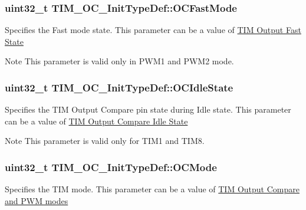 \subsubsection[{\texorpdfstring{O\+C\+Fast\+Mode}{OCFastMode}}]{\setlength{\rightskip}{0pt plus 5cm}uint32\+\_\+t T\+I\+M\+\_\+\+O\+C\+\_\+\+Init\+Type\+Def\+::\+O\+C\+Fast\+Mode}\hypertarget{struct_t_i_m___o_c___init_type_def_a4c4203c5ed779ac86fb793bb9d628e55}{}\label{struct_t_i_m___o_c___init_type_def_a4c4203c5ed779ac86fb793bb9d628e55}
Specifies the Fast mode state. This parameter can be a value of \hyperlink{group___t_i_m___output___fast___state}{T\+IM Output Fast State} \begin{DoxyNote}{Note}
This parameter is valid only in P\+W\+M1 and P\+W\+M2 mode. 
\end{DoxyNote}
\subsubsection[{\texorpdfstring{O\+C\+Idle\+State}{OCIdleState}}]{\setlength{\rightskip}{0pt plus 5cm}uint32\+\_\+t T\+I\+M\+\_\+\+O\+C\+\_\+\+Init\+Type\+Def\+::\+O\+C\+Idle\+State}\hypertarget{struct_t_i_m___o_c___init_type_def_ace3e2b76ca2fca0f4961585ed9ebecf5}{}\label{struct_t_i_m___o_c___init_type_def_ace3e2b76ca2fca0f4961585ed9ebecf5}
Specifies the T\+IM Output Compare pin state during Idle state. This parameter can be a value of \hyperlink{group___t_i_m___output___compare___idle___state}{T\+IM Output Compare Idle State} \begin{DoxyNote}{Note}
This parameter is valid only for T\+I\+M1 and T\+I\+M8. 
\end{DoxyNote}
\subsubsection[{\texorpdfstring{O\+C\+Mode}{OCMode}}]{\setlength{\rightskip}{0pt plus 5cm}uint32\+\_\+t T\+I\+M\+\_\+\+O\+C\+\_\+\+Init\+Type\+Def\+::\+O\+C\+Mode}\hypertarget{struct_t_i_m___o_c___init_type_def_ae5faa1cba0b3f1ab6179cc54e1015ee8}{}\label{struct_t_i_m___o_c___init_type_def_ae5faa1cba0b3f1ab6179cc54e1015ee8}
Specifies the T\+IM mode. This parameter can be a value of \hyperlink{group___t_i_m___output___compare__and___p_w_m__modes}{T\+IM Output Compare and P\+WM modes} 
